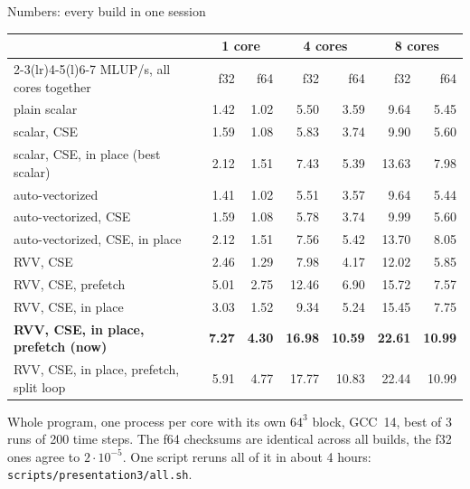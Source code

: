 \documentclass[aspectratio=169,10pt,t]{beamer}
\newcommand{\code}[1]{\texttt{#1}}
\begin{document}
\begin{frame}{Numbers: every build in one session}
  \vspace{1mm}
  \centering
  {\footnotesize\renewcommand{\arraystretch}{1.05}
  \begin{tabular}{@{}lrrrrrr@{}}
    \toprule
    & \multicolumn{2}{c}{\textbf{1 core}} & \multicolumn{2}{c}{\textbf{4 cores}}
      & \multicolumn{2}{c}{\textbf{8 cores}}\\
    \cmidrule(lr){2-3}\cmidrule(lr){4-5}\cmidrule(l){6-7}
    MLUP/s, all cores together & f32 & f64 & f32 & f64 & f32 & f64\\
    \midrule
    plain scalar & 1.42 & 1.02 & 5.50 & 3.59 & 9.64 & 5.45\\
    scalar, CSE & 1.59 & 1.08 & 5.83 & 3.74 & 9.90 & 5.60\\
    scalar, CSE, in place (best scalar) & 2.12 & 1.51 & 7.43 & 5.39 & 13.63 & 7.98\\
    \midrule
    auto-vectorized & 1.41 & 1.02 & 5.51 & 3.57 & 9.64 & 5.44\\
    auto-vectorized, CSE & 1.59 & 1.08 & 5.78 & 3.74 & 9.99 & 5.60\\
    auto-vectorized, CSE, in place & 2.12 & 1.51 & 7.56 & 5.42 & 13.70 & 8.05\\
    \midrule
    RVV, CSE & 2.46 & 1.29 & 7.98 & 4.17 & 12.02 & 5.85\\
    RVV, CSE, prefetch & 5.01 & 2.75 & 12.46 & 6.90 & 15.72 & 7.57\\
    RVV, CSE, in place & 3.03 & 1.52 & 9.34 & 5.24 & 15.45 & 7.75\\
    \textbf{RVV, CSE, in place, prefetch (now)} & \textbf{7.27} & \textbf{4.30} & \textbf{16.98}
      & \textbf{10.59} & \textbf{22.61} & \textbf{10.99}\\
    RVV, CSE, in place, prefetch, split loop & 5.91 & 4.77 & 17.77 & 10.83 & 22.44 & 10.99\\
    \bottomrule
  \end{tabular}\par}

  \vspace{3mm}
  \raggedright
  {\scriptsize\color{psgray}
  Whole program, one process per core with its own $64^3$ block, GCC~14, best of 3 runs of 200
  time steps. The f64 checksums are identical across all builds, the f32 ones agree to
  $2\cdot 10^{-5}$. One script reruns all of it in about 4 hours:
  \code{scripts/presentation3/all.sh}.\par}
\end{frame}
\end{document}
